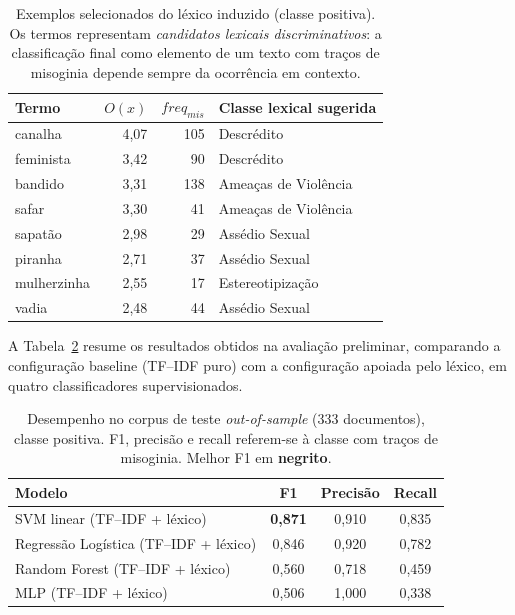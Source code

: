 \documentclass[12pt]{article}
\begin{document}
\begin{table}[ht]
\centering
\caption{Exemplos selecionados do l\'exico induzido (classe positiva).
Os termos representam \emph{candidatos lexicais discriminativos}: a
classifica\c{c}\~ao final como elemento de um texto com tra\c{c}os de
misoginia depende sempre da ocorr\^encia em contexto.}
\label{tab:exemplos}
\begin{tabular}{lrrl}
\toprule
\textbf{Termo} & \textbf{$O(x)$} & \textbf{$\mathit{freq}_{mis}$} &
\textbf{Classe lexical sugerida} \\
\midrule
canalha      & 4{,}07 & 105 & Descr\'edito \\
feminista    & 3{,}42 &  90 & Descr\'edito \\
bandido      & 3{,}31 & 138 & Amea\c{c}as de Viol\^encia \\
safar        & 3{,}30 &  41 & Amea\c{c}as de Viol\^encia \\
sapat\~ao    & 2{,}98 &  29 & Ass\'edio Sexual \\
piranha      & 2{,}71 &  37 & Ass\'edio Sexual \\
mulherzinha  & 2{,}55 &  17 & Estereotipiza\c{c}\~ao \\
vadia        & 2{,}48 &  44 & Ass\'edio Sexual \\
\bottomrule
\end{tabular}
\end{table}

A Tabela~\ref{tab:resultados} resume os resultados obtidos na
avalia\c{c}\~ao preliminar, comparando a configura\c{c}\~ao baseline
(TF--IDF puro) com a configura\c{c}\~ao apoiada pelo l\'exico, em quatro
classificadores supervisionados.

\begin{table}[ht]
\centering
\caption{Desempenho no corpus de teste \emph{out-of-sample} (333
documentos), classe positiva. F1, precis\~ao e recall referem-se \`a
classe com tra\c{c}os de misoginia. Melhor F1 em \textbf{negrito}.}
\label{tab:resultados}
\begin{tabular}{lccc}
\toprule
\textbf{Modelo} & \textbf{F1} & \textbf{Precis\~ao} & \textbf{Recall} \\
\midrule
SVM linear (TF--IDF + l\'exico)         & \textbf{0,871} & 0,910 & 0,835 \\
Regress\~ao Log\'istica (TF--IDF + l\'exico) & 0,846 & 0,920 & 0,782 \\
Random Forest (TF--IDF + l\'exico)      & 0,560 & 0,718 & 0,459 \\
MLP (TF--IDF + l\'exico)                & 0,506 & 1,000 & 0,338 \\
\bottomrule
\end{tabular}
\end{table}
\end{document}
